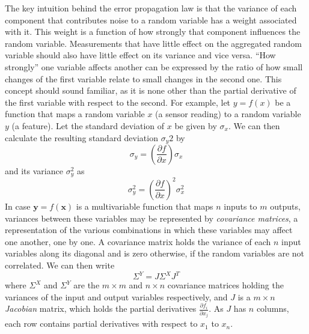 The key intuition behind the error propagation law is that the variance of each component that contributes noise to a random variable has a weight associated with it. This weight is a function of how strongly that component influences the random variable. Measurements that have little effect on the
aggregated random variable should also have little effect on its variance and vice versa. ``How strongly'' one variable affects another
can be expressed by the ratio of how small changes of the first variable relate to small changes in the second one. This concept should sound familiar, as it is none other 
than the partial derivative of the first variable with respect to the second. For example, let $y=f(x)$ be a function that maps a random variable $x$ (a sensor reading) to a random variable $y$ (a feature). Let the standard deviation of $x$ be given by $\sigma_x$. We can then calculate the resulting standard deviation $\sigma_y2$ by
\begin{equation}
\sigma_y=\left(\frac{\partial f}{\partial x}\right) \sigma_x
\end{equation}
and its variance $\sigma_y^2$ as
\begin{equation}
\sigma_y^2=\left(\frac{\partial f}{\partial x}\right)^2 \sigma_x^2
\end{equation}
In case $\mathbf{y}=f(\mathbf{x})$ is a multivariable function that maps $n$ inputs to $m$ outputs, variances between these
variables may be represented by \textsl{covariance matrices}, a representation of the various combinations in
which these variables may affect one another, one by one. A covariance matrix holds the variance of each $n$ input variables along its diagonal and is zero otherwise, if the random variables are not correlated. We can then write
\begin{equation}
\Sigma^Y= J \Sigma^X J^T
\end{equation}
where $\Sigma^X$ and $\Sigma^Y$ are the $m \times m$ and $n \times n$ covariance matrices holding the variances of the input and output variables respectively, and
$J$ is a $m \times n$ \textsl{Jacobian} matrix, which holds the partial derivatives $\frac{\partial f_i}{\partial x_j}$. As $J$ has $n$ columns, each row contains partial derivatives with respect to $x_1$ to $x_n$.

